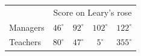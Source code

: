 \documentclass{beamer}
\begin{document}
\begin{frame}
\begin{center}
\begin{minipage}{\framewidth}
\begin{center}
\begin{tabular}{lcccc}
         & \multicolumn{4}{c}{Score on Leary's rose} \\ \cmidrule{1-5}
Managers & $46^\circ$ & $92^\circ$ & $102^\circ$ & $122^\circ$ \\
Teachers & $80^\circ$ & $47^\circ$ & $5^\circ$ & $355^\circ$ \\
\end{tabular}
\end{center}
\end{minipage}
\begin{minipage}[l]{0.42\framewidth}
\vspace{0.1cm}

\end{minipage}
\end{center}
\end{frame}
\end{document}

